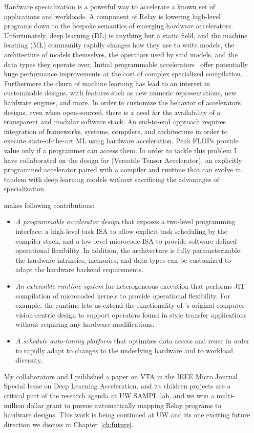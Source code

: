 Hardware specialization is a powerful way to accelerate
  a known set of applications and workloads.
A component of Relay is lowering high-level programs down
  to the bespoke semantics of emerging hardware accelerators.
Unfortunately, deep learning (DL) is anything but a static field, and the machine learning (ML) community
  rapidly changes how they use to write models, the architecture of models themselves, the operators
  used by said models, and the data types they operate over.
Initial programmable accelerators~\citep{tpuv1} offer potentially huge performance
  improvements at the cost of complex specialized compilation.
Furthermore the churn of machine learning has lead to an interest
  in customizable designs, with features such as new numeric representations,
  new hardware engines, and more.
In order to customize the behavior of accelerators designs, even when open-sourced,
  there is a need for the availability of a transparent and modular software stack.
An end-to-end approach requires integration of frameworks, systems, compilers,
  and architecture in order to execute state-of-the-art ML using hardware acceleration.
Peak FLOPs provide value only if a programmer can access them.
In order to tackle this problem I have collaborated on the design for \vta (Versatile Tensor Accelerator),
  an explicitly programmed accelerator paired with a compiler and runtime that can evolve
  in tandem with deep learning models without sacrificing the advantages of specialization.

\vta makes following contributions:

\begin{itemize}
    \item \emph{A programmable accelerator design} that exposes a two-level programming interface: a high-level task ISA to allow explicit task scheduling by the compiler stack, and a low-level microcode ISA to provide software-defined operational flexibility.
    In addition, the \vta architecture is fully parameterizable: the hardware intrinsics, memories, and data types can be customized to adapt the hardware backend requirements.
    \item \emph{An extensible runtime system} for heterogeneous execution that performs JIT compilation of microcoded kernels to provide operational flexibility. For example, the \vta runtime lets us extend the functionality of \vta's original computer-vision-centric design to support operators found in style transfer applications without requiring any hardware modifications.
    \item \emph{A schedule auto-tuning platform} that optimizes data access and reuse in order to rapidly adapt to changes to the underlying hardware and to workload diversity.
\end{itemize}

My collaborators and I published a paper on VTA in
  the IEEE Micro Journal Special Issue on Deep Learning Acceleration.
\vta and its children projects are a critical part of the research
  agenda at UW SAMPL lab, and we won a multi-million dollar grant to
  pursue automatically mapping Relay programs to hardware designs.
This work is being continued at UW and its one exciting future
  direction we discuss in Chapter~\ref{ch:future}.
